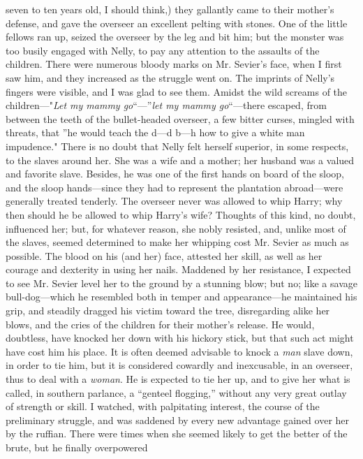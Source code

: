 seven to ten years old, I should think,) they gallantly came to their
mother's defense, and gave the overseer an excellent pelting with
stones. One of the little fellows ran up, seized the overseer by the leg
and bit him; but the monster was too busily engaged with Nelly, to pay
any attention to the assaults of the children. There were numerous
bloody marks on Mr. Sevier's face, when I first saw him, and they
increased as the struggle went on. The imprints of Nelly's fingers were
visible, and I was glad to see them. Amidst the wild screams of the
children---"\emph{Let my mammy go}``---''\emph{let my mammy
go}``---there escaped, from between the teeth of the bullet-headed
overseer, a few bitter curses, mingled with threats, that ''he would
teach the d---d b---h how to give a white man impudence." There is no
doubt that Nelly felt herself superior, in some respects, to the slaves
around her. She was a wife and a mother; her husband was a valued and
favorite slave. Besides, he was one of the first hands on board of the
sloop, and the sloop hands---since they had to represent the plantation
abroad---were generally treated tenderly. The overseer never was allowed
to whip Harry; why then should he be allowed to whip Harry's wife?
Thoughts of this kind, no doubt, influenced her; but, for whatever
reason, she nobly resisted, and, unlike most of the slaves, seemed
determined to make her whipping {\protect\hypertarget{94}{}{}}cost Mr.
Sevier as much as possible. The blood on his (and her) face, attested
her skill, as well as her courage and dexterity in using her nails.
Maddened by her resistance, I expected to see Mr. Sevier level her to
the ground by a stunning blow; but no; like a savage bull-dog---which he
resembled both in temper and appearance---he maintained his grip, and
steadily dragged his victim toward the tree, disregarding alike her
blows, and the cries of the children for their mother's release. He
would, doubtless, have knocked her down with his hickory stick, but that
such act might have cost him his place. It is often deemed advisable to
knock a \emph{man} slave down, in order to tie him, but it is considered
cowardly and inexcusable, in an overseer, thus to deal with a
\emph{woman}. He is expected to tie her up, and to give her what is
called, in southern parlance, a ``genteel flogging,'' without any very
great outlay of strength or skill. I watched, with palpitating interest,
the course of the preliminary struggle, and was saddened by every new
advantage gained over her by the ruffian. There were times when she
seemed likely to get the better of the brute, but he finally overpowered
